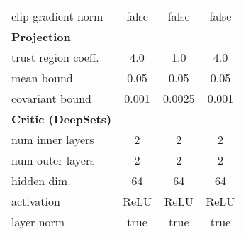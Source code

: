 \begin{table}[htb]
\begin{adjustbox}{max width=\textwidth}
\begin{tabular}{lccc}
clip gradient norm     & false       & false       & false             \\ 
\textbf{Projection}    &             &             &                \\
trust region coeff.    & 4.0         & 1.0         & 4.0              \\ 
mean bound             & 0.05        & 0.05        & 0.05             \\ 
covariant bound        & 0.001       & 0.0025      & 0.001             \\
\midrule
\textbf{Critic (DeepSets)}                  &              &             & \\ 
num inner layers                 & 2         & 2          & 2 \\
num outer layers                 & 2         & 2          & 2 \\
hidden dim.                      & 64           & 64          & 64 \\
activation                       & ReLU         & ReLU        & ReLU \\
layer norm                       & true         & true        & true  \\ 
\bottomrule
\end{tabular}
\end{adjustbox}
\end{table}

